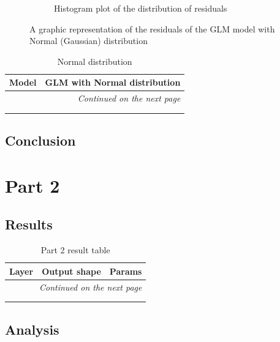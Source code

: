\documentclass[12pt,a4paper,twoside]{article}
\begin{document}
\begin{figure}[!ht]
\begin{subfigure}{.45\textwidth}
        \caption{Histogram plot of the distribution of residuals}
        \label{fig:gaussianhist}
    \end{subfigure}
    \caption{A graphic representation of the residuals of the GLM model with Normal (Gaussian) distribution}
    \label{fig:gaussianfig}
\end{figure}

\begin{longtable}{l|p{}|p{}}
	\textbf{Model} & \multicolumn{2}{r}{GLM with Normal distribution} \\
	\hline
	\endhead
	\hline
	\multicolumn{3}{r}{\emph{Continued on the next page}}    \\
	\endfoot
	\hline
	\endlastfoot
	\hline
	 &  &  \\
	 \caption{Normal distribution}
	 \label{tab:gaussiantab}
\end{longtable}

\subsection{Conclusion}
\label{ssec:conclusion}

\newpage
\section{Part 2}
\subsection{Results}
\begin{longtable}{l|p{}|p{}}
	\textbf{Layer} & \textbf{Output shape} & \textbf{Params} \\
	\hline
	\endhead
	\hline
	\multicolumn{3}{r}{\emph{Continued on the next page}}    \\
	\endfoot
	\hline
	\endlastfoot
	\hline
	 &  &  \\
	\caption{Part 2 result table}
	\label{tab:part2res}
\end{longtable}
\subsection{Analysis}
\end{document}
